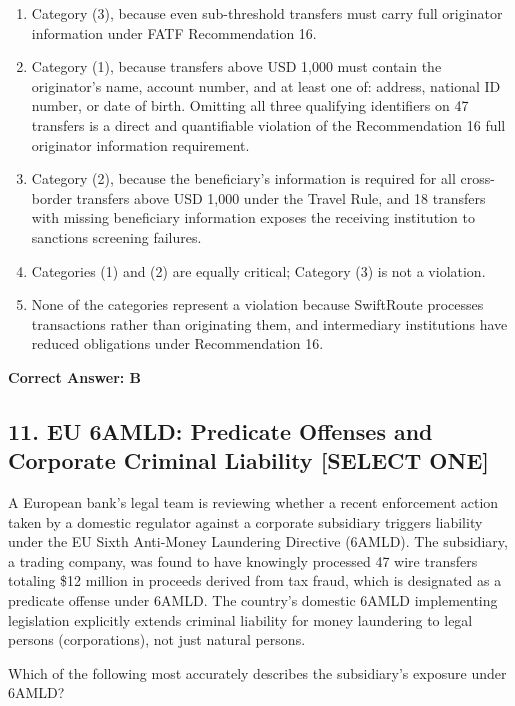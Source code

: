 \documentclass[11pt,a4paper]{article}
\begin{document}
	\begin{enumerate}[label=\Alph*.]
		\item Category (3), because even sub-threshold transfers must carry full originator information under FATF Recommendation 16.
		\item Category (1), because transfers above USD 1,000 must contain the originator's name, account number, and at least one of: address, national ID number, or date of birth. Omitting all three qualifying identifiers on 47 transfers is a direct and quantifiable violation of the Recommendation 16 full originator information requirement.
		\item Category (2), because the beneficiary's information is required for all cross-border transfers above USD 1,000 under the Travel Rule, and 18 transfers with missing beneficiary information exposes the receiving institution to sanctions screening failures.
		\item Categories (1) and (2) are equally critical; Category (3) is not a violation.
		\item None of the categories represent a violation because SwiftRoute processes transactions rather than originating them, and intermediary institutions have reduced obligations under Recommendation 16.
	\end{enumerate}
	\textbf{Correct Answer: B}
	
	\subsection{11. EU 6AMLD: Predicate Offenses and Corporate Criminal Liability \textnormal{[SELECT ONE]}}
	
	A European bank's legal team is reviewing whether a recent enforcement action taken by a domestic regulator against a corporate subsidiary triggers liability under the EU Sixth Anti-Money Laundering Directive (6AMLD). The subsidiary, a trading company, was found to have knowingly processed 47 wire transfers totaling \$12 million in proceeds derived from tax fraud, which is designated as a predicate offense under 6AMLD. The country's domestic 6AMLD implementing legislation explicitly extends criminal liability for money laundering to legal persons (corporations), not just natural persons.
	
	Which of the following most accurately describes the subsidiary's exposure under 6AMLD?
	
\end{document}
